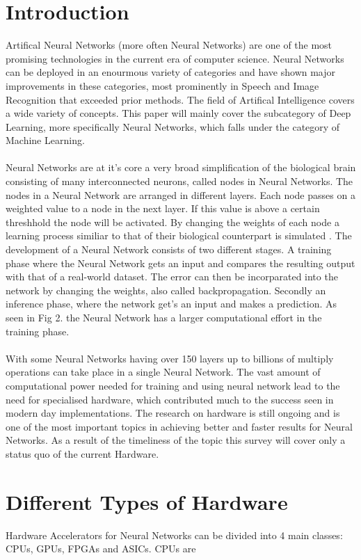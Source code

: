 \documentclass[conference]{IEEEtran}
\begin{document}
\section{Introduction}
Artifical Neural Networks (more often Neural Networks) are one of the most promising technologies in the current era of computer science. Neural Networks can be deployed in an enourmous variety of categories and have shown major improvements in these categories, most prominently in Speech and Image Recognition \cite{speech_recognition1} that exceeded prior methods. The field of Artifical Intelligence covers a wide variety of concepts. This paper will mainly cover the subcategory of Deep Learning, more specifically Neural Networks, which falls under the category of Machine Learning. 
\\
\\
Neural Networks are at it's core a very broad simplification of the biological brain consisting of many interconnected neurons, called nodes in Neural Networks. The nodes in a Neural Network are  arranged in different layers. Each node passes on a weighted value to a node in the next layer. If this value is above a certain threshhold the node will be activated. By changing the weights of each node a learning process similiar to that of their biological counterpart is simulated \cite{nn_basics}.
The development of a Neural Network consists of two different stages. A training phase where the Neural Network gets an input and compares the resulting output with that of a real-world dataset. The error can then be incorparated into the network by changing the weights, also called backpropagation. Secondly an inference phase, where the network get's an input and makes a prediction. As seen in Fig 2. the Neural Network has a larger computational effort in the training phase.
\\
\\
With some Neural Networks having over 150 layers \cite{densely_network} up to billions of multiply operations can take place in a single Neural Network. The vast amount of computational power needed for training and using neural network lead to the need for specialised hardware, which contributed much to the success seen in modern day implementations. The research on hardware is still ongoing and is one of the most important topics in achieving better and faster results for Neural Networks. As a result of the timeliness of the topic this survey will cover only a status quo of the current Hardware.

\section{Different Types of Hardware}
Hardware Accelerators for Neural Networks can be divided into 4 main classes: CPUs, GPUs, FPGAs and ASICs. CPUs are

\newpage
\quad
\newpage



\end{document}

